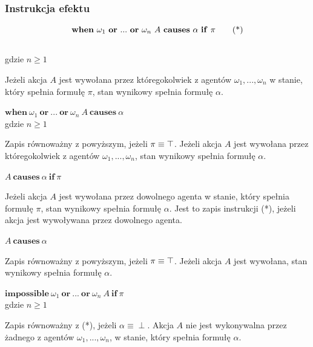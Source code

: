 \documentclass[11pt,a4paper]{article}
\def\tang{\ThisStyle{\abovebaseline[0pt]{\scalebox{-1}{$\SavedStyle\perp$}}}}
\begin{document}
    \subsubsection{Instrukcja efektu}    
    \vspace{-8mm}
    \begin{center}
    	\begin{equation}       \vspace{-4mm}\mathbf{when}~\omega_1~\mathbf{or}~...~\mathbf{or}~\omega_n~A~\mathbf{causes}~\alpha~\mathbf{if}~\pi\tag{*}
    	\end{equation}
    	\\gdzie $n \geq 1$
    \end{center}
    Jeżeli akcja $A$ jest wywołana przez któregokolwiek z agentów $\omega_1, ..., \omega_n$ w stanie, który spełnia formułę $\pi$, stan wynikowy spełnia formułę $\alpha$.
    
    \begin{center}
        $\mathbf{when}~\omega_1~\mathbf{or}~...~\mathbf{or}~\omega_n~A~\mathbf{causes}~\alpha$
        \\gdzie $n \geq 1$
    \end{center}
    Zapis równoważny z powyższym, jeżeli $\pi \equiv \tang$. Jeżeli akcja $A$ jest wywołana przez któregokolwiek z agentów $\omega_1, ..., \omega_n$, stan wynikowy spełnia formułę $\alpha$.
    
    \begin{center}
        $A~\mathbf{causes}~\alpha~\mathbf{if}~\pi$    
    \end{center}
    Jeżeli akcja $A$ jest wywołana przez dowolnego agenta w stanie, który spełnia formułę $\pi$, stan wynikowy spełnia formułę $\alpha$. Jest to zapis instrukcji (*), jeżeli akcja jest wywoływana przez dowolnego agenta.
    
    \begin{center}
        $A~\mathbf{causes}~\alpha$
    \end{center}
    Zapis równoważny z powyższym, jeżeli $\pi \equiv \tang$. Jeżeli akcja $A$ jest wywołana, stan wynikowy spełnia formułę $\alpha$.
    
    \begin{center}
        $\mathbf{impossible}~\omega_1~\mathbf{or}~...~\mathbf{or}~\omega_n~A~\mathbf{if}~\pi$
        \\gdzie $n \geq 1$
    \end{center}
    Zapis równoważny z (*), jeżeli $\alpha \equiv \perp$. Akcja $A$ nie jest wykonywalna przez żadnego z agentów $\omega_1, ..., \omega_n$, w stanie, który spełnia formułę $\alpha$. 
    
\end{document}
